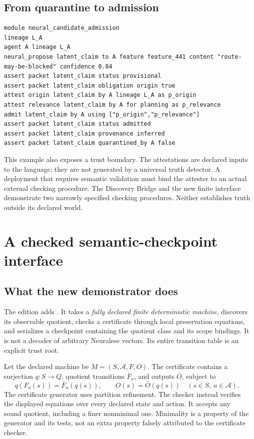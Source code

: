 \documentclass[11pt]{article}
\begin{document}
\subsection{From quarantine to admission}
\begin{lstlisting}
module neural_candidate_admission
lineage L_A
agent A lineage L_A
neural_propose latent_claim to A feature feature_441 content "route-may-be-blocked" confidence 0.84
assert packet latent_claim status provisional
assert packet latent_claim obligation origin true
attest origin latent_claim by A lineage L_A as p_origin
attest relevance latent_claim by A for planning as p_relevance
admit latent_claim by A using ["p_origin","p_relevance"]
assert packet latent_claim status admitted
assert packet latent_claim provenance inferred
assert packet latent_claim quarantined_by A false
\end{lstlisting}
This example also exposes a trust boundary. The attestations are declared inputs to the language; they are not generated by a universal truth detector. A deployment that requires semantic validation must bind the attester to an actual external checking procedure. The Discovery Bridge and the new finite interface demonstrate two narrowly specified checking procedures. Neither establishes truth outside its declared world.

\section{A checked semantic-checkpoint interface}
\subsection{What the new demonstrator does}
The edition adds . It takes a \emph{fully declared finite deterministic machine}, discovers its observable quotient, checks a certificate through local preservation equations, and serializes a checkpoint containing the quotient class and its scope bindings. It is not a decoder of arbitrary Neuralese vectors. Its entire transition table is an explicit trust root.

Let the declared machine be \(M=(S,\mathcal A,F,O)\). The certificate contains a surjection \(q:S\to Q\), quotient transitions \(\bar F_a\), and outputs \(\bar O\), subject to
\begin{equation}\label{eq:finitecertificate}
 q(F_a(s))=\bar F_a(q(s)),\qquad O(s)=\bar O(q(s))
 \quad(s\in S,\ a\in\mathcal A).
\end{equation}
The certificate generator uses partition refinement. The checker instead verifies the displayed equations over every declared state and action. It accepts any sound quotient, including a finer nonminimal one. Minimality is a property of the generator and its tests, not an extra property falsely attributed to the certificate checker.
\end{document}
